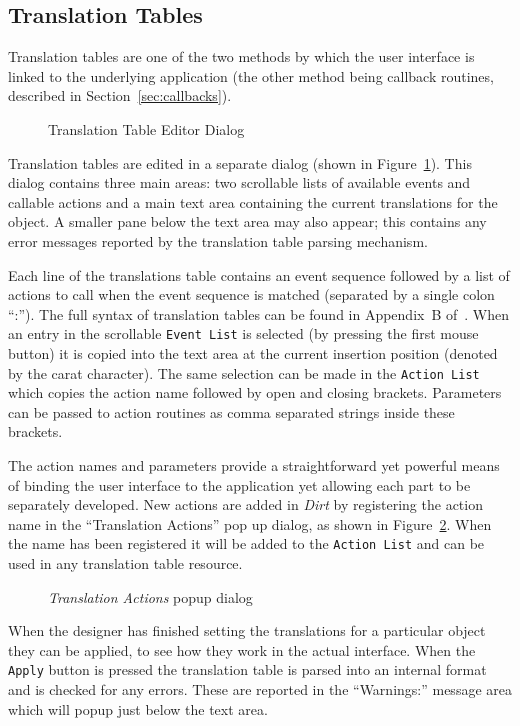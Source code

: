 \subsection{Translation Tables}
\label{sec:editing-translations}
Translation tables are one of the two methods by which the user interface is
linked to the underlying application (the other method being callback
routines, described in Section~\ref{sec:callbacks}).
\begin{figure}
\centerline{}
\caption{Translation Table Editor Dialog}
\label{fig:translations}
\end{figure}
Translation tables are edited in a separate dialog (shown in
Figure~\ref{fig:translations}).  This dialog contains three main areas: two
scrollable lists of available events and callable actions and a main text
area containing the current translations for the object.  A smaller pane
below the text area may also appear; this contains any error messages
reported by the translation table parsing mechanism.

Each line of the translations table contains an event sequence followed by a
list of actions to call when the event sequence is matched (separated by a
single colon ``:'').  The full
syntax of translation tables can be found in Appendix~B
of~\cite{XtIntrinsics}.  When an entry in the scrollable {\tt Event List}
is selected (by pressing the first mouse button) it is copied into the
text area at the current insertion position (denoted by the carat character).
The same selection can be made in the {\tt Action List} which copies the
action name followed by open and closing brackets.  Parameters can be passed
to action routines as comma separated strings inside these brackets.

The action names and parameters provide a straightforward yet powerful means
of binding the user interface to the application yet allowing each part to be
separately developed.  New actions are added in {\em Dirt} by registering the
action name in the ``Translation Actions'' pop up dialog, as shown in
Figure~\ref{fig:action-dialog}.  When the name has been registered it will be
added to the {\tt Action List} and can be used in any translation table
resource.
\begin{figure}
\centerline{}
\caption{{\em Translation Actions} popup dialog}
\label{fig:action-dialog}
\end{figure}

When the designer has finished setting the translations for a particular
object they can be applied, to see how they work in the actual interface.
When the {\tt Apply} button is pressed the translation table is parsed into
an internal format and is checked for any errors.  These are reported in the
``Warnings:'' message area which will popup just below the text area.

